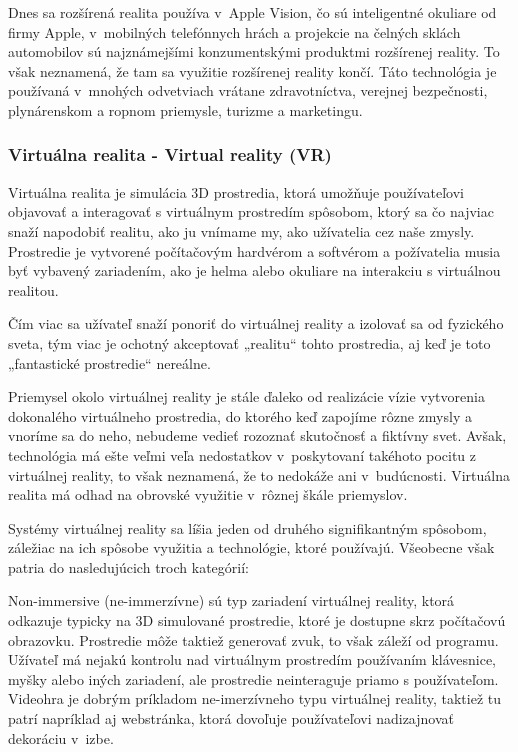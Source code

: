 Dnes sa rozšírená realita používa v~Apple Vision, čo sú inteligentné okuliare od firmy Apple, v~mobilných telefónnych hrách a projekcie na čelných sklách automobilov sú najznámejšími konzumentskými produktmi rozšírenej reality. To však neznamená, že tam sa využitie rozšírenej reality končí. Táto technológia je používaná v~mnohých odvetviach vrátane zdravotníctva, verejnej bezpečnosti, plynárenskom a ropnom priemysle, turizme a marketingu. %

\subsubsection{Virtuálna realita - Virtual reality (VR)}

Virtuálna realita je simulácia 3D prostredia, ktorá umožňuje používateľovi objavovať a interagovať s virtuálnym prostredím spôsobom, ktorý sa čo najviac snaží napodobiť realitu, ako ju vnímame my, ako užívatelia cez naše zmysly. Prostredie je vytvorené počítačovým hardvérom a softvérom a požívatelia musia byť vybavený zariadením, ako je helma alebo okuliare na interakciu s virtuálnou realitou. 

Čím viac sa užívateľ snaží ponoriť do virtuálnej reality a izolovať sa od fyzického sveta, tým viac je ochotný akceptovať „realitu“ tohto prostredia, aj keď je toto „fantastické prostredie“ nereálne.

Priemysel okolo virtuálnej reality je stále ďaleko od realizácie vízie vytvorenia dokonalého virtuálneho prostredia, do ktorého keď zapojíme rôzne zmysly a  vnoríme sa do neho, nebudeme vedieť rozoznať skutočnosť a fiktívny svet. Avšak, technológia má ešte veľmi veľa nedostatkov v~poskytovaní takéhoto pocitu z virtuálnej reality, to však neznamená, že to nedokáže ani v~budúcnosti. Virtuálna realita má odhad na obrovské využitie v~rôznej škále priemyslov. 

Systémy virtuálnej reality sa líšia jeden od druhého signifikantným spôsobom, záležiac na ich spôsobe využitia a technológie, ktoré používajú. Všeobecne však patria do nasledujúcich troch kategórií: 

Non-immersive (ne-immerzívne) sú typ zariadení virtuálnej reality, ktorá odkazuje typicky na 3D simulované prostredie, ktoré je dostupne skrz počítačovú obrazovku. Prostredie môže taktiež generovať zvuk, to však záleží od programu. Užívateľ má nejakú kontrolu nad virtuálnym prostredím používaním klávesnice, myšky alebo iných zariadení, ale prostredie neinteraguje priamo s používateľom. Videohra je dobrým príkladom ne-imerzívneho typu virtuálnej reality, taktiež tu patrí napríklad aj webstránka, ktorá dovoľuje používateľovi nadizajnovať dekoráciu v~izbe. 

